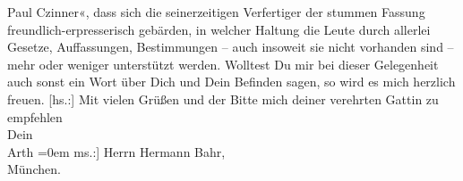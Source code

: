 \begin{ledgroupsized}[t]{13cm}
{{{                        Paul Czinner}}}\label{K_L02546-5h}«, dass sich die seinerzeitigen Verfertiger der stummen Fassung
               freundlich-erpresserisch gebärden, in welcher Haltung die Leute durch allerlei
               Gesetze, Auffassungen, Bestimmungen – auch insoweit sie nicht vorhanden sind – mehr
               oder weniger unterstützt werden.\pend
           \pstart
           Wolltest Du mir bei dieser Gelegenheit auch sonst ein Wort über Dich und Dein
               Befinden sagen, so wird es mich herzlich freuen.\pend
           \pstart
           {[}hs.:{]} Mit vielen Grüßen und der Bitte mich deiner verehrten Gattin zu empfehlen{\\[\baselineskip]}Dein{\\[\baselineskip]}\spacefill\mbox{Arth}\pend
           \leftskip=0em{}\pstart
           \noindent{}{[}ms.:{]}  Herrn Hermann Bahr,{\\}München.\pend
           
         
         \endnumbering{}\end{ledgroupsized}  \newcommand{\dateiname}{L02546}\newcommand{\titel}{Arthur Schnitzler an Hermann Bahr, 5. 9. 1931}\newcommand{\editorInnen}{ Kurt Ifkovits,  Martin Anton Müller}
      